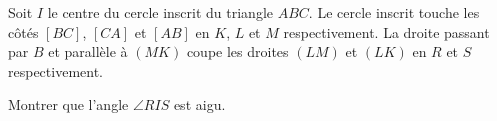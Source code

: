 Soit $I$ le centre du cercle inscrit du triangle $ABC$. Le cercle inscrit touche les côtés $[BC]$, $[CA]$ et $[AB]$ en $K$, $L$ et $M$ respectivement. La droite passant par $B$ et parallèle à $(MK)$ coupe les droites $(LM)$ et $(LK)$ en $R$ et $S$ respectivement.

Montrer que l'angle $\angle RIS$ est aigu.
